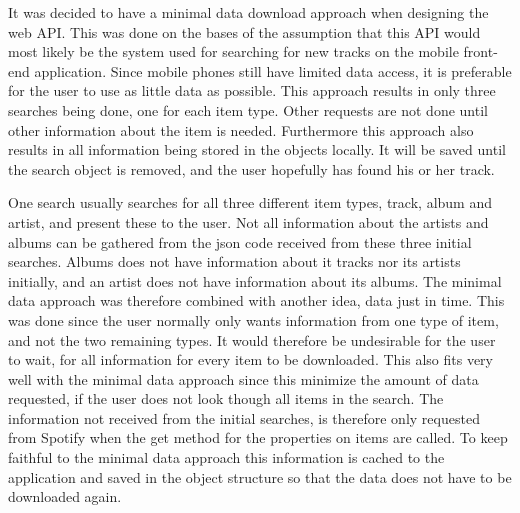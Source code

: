 It was decided to have a minimal data download approach when designing the web API. This was done on the bases of the assumption that this API would most likely be the system used for searching for new tracks on the mobile front-end application. Since mobile phones still have limited data access, it is preferable for the user to use as little data as possible. This approach results in only three searches being done, one for each item type. Other requests are not done until other information about the item is needed. Furthermore this approach also results in all information being stored in the objects locally. It will be saved until the search object is removed, and the user hopefully has found his or her track.

One search usually searches for all three different item types, track, album and artist, and present these to the user. Not all information about the artists and albums can be gathered from the json code received from these three initial searches. Albums does not have information about it tracks nor its artists initially, and an artist does not have information about its albums. The minimal data approach was therefore combined with another idea, data just in time. This was done since the user normally only wants information from one type of item, and not the two remaining types. It would therefore be undesirable for the user to wait, for all information for every item to be downloaded. This also fits very well with the minimal data approach since this minimize the amount of data requested, if the user does not look though all items in the search. The information not received from the initial searches, is therefore only requested from Spotify when the get method for the properties on items are called. To keep faithful to the minimal data approach this information is cached to the application and saved in the object structure so that the data does not have to be downloaded again.

